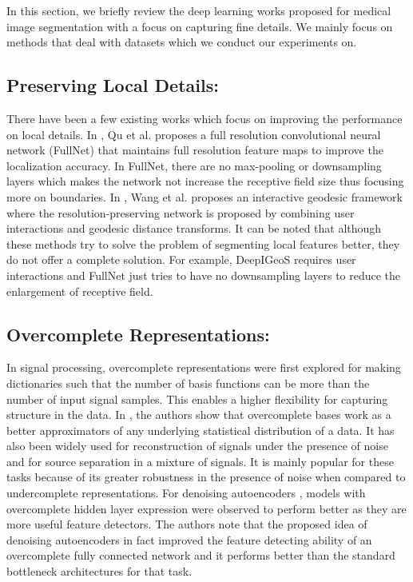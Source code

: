 \documentclass[journal,twoside,web]{ieeecolor}
\begin{document}
In this section, we briefly review the deep learning works proposed for medical image segmentation with a focus on capturing fine details. We mainly focus on methods that deal with datasets which we conduct our experiments on. 



\subsection{Preserving Local Details:}
There have been a few existing works which focus on improving the performance on local details. In \cite{qu2019improving}, Qu et al. proposes a full resolution convolutional neural network (FullNet) that maintains full resolution feature maps to improve the localization accuracy. In FullNet, there are no max-pooling or downsampling layers which makes the network not increase the receptive field size thus focusing more on boundaries. In \cite{wang2018deepigeos}, Wang et al. proposes an interactive geodesic framework where the resolution-preserving network is proposed by combining user interactions and geodesic distance transforms. It can be noted that although these methods try to solve the problem of segmenting local features better, they do not offer a complete solution. For example, DeepIGeoS requires user interactions and FullNet just tries to have no downsampling layers to reduce the enlargement of receptive field. 

\subsection{Overcomplete Representations:}

In signal processing, overcomplete representations \cite{lewicki2000learning} were first explored for making dictionaries such that the number of basis functions can be more than the number of input signal samples. This enables a higher flexibility for capturing structure in the data. In \cite{lewicki2000learning}, the authors show that overcomplete bases work as a better approximators of any underlying statistical distribution of a data. It has also been widely used for reconstruction of signals under the presence of noise and for source separation in a mixture of signals. It is mainly popular for these tasks because of its greater robustness in the presence of noise when compared to undercomplete representations. For denoising autoencoders \cite{vincent2008extracting}, models with overcomplete hidden layer expression were observed to perform better as they are more useful feature detectors. The authors note that the proposed idea of denoising autoencoders in fact improved the feature detecting ability of an overcomplete fully connected network and it performs better than the standard bottleneck architectures for that task. 
\end{document}
